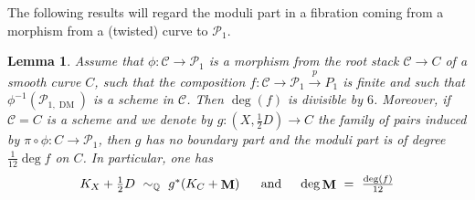 \documentclass[a4paper,12pt]{amsart}
\newcommand{\marg}[1]{\normalsize{{\color{red}\footnote{{\color{blue}#1}}}{\marginpar[{\color{blue}\hfill\tiny\thefootnote$\rightarrow$}]{{\color{purple}$\leftarrow$\tiny\thefootnote}}}}}
\DeclareMathOperator{\Pic}{Pic}
\newcommand{\bQ}{{\mathbb Q}}
\newcommand{\bP}{{\mathbb P}}
\newcommand{\sP}{{\mathscr{P}}}
\DeclareMathOperator{\bfM}{{\bf{M}}}
\newcommand\cC{{\mathcal{C}}}
\newcommand\cM{{\mathcal{M}}}
\newtheorem{lemma}[theorem]{Lemma}
\newtheorem*{notation}{Notation}
\newcommand{\Gio}[1]{\marg{(Giovanni) #1}}
\newcommand{\dm}{{\operatorname{DM}}}
\theoremstyle{definition}
\theoremstyle{remark}
\begin{document}
The following results will regard the moduli part in a fibration coming from a morphism from a (twisted) curve to $\sP_1$.
\begin{lemma}\label{lemma_relation_degree_of_map_to_p1_and_moduli_part}
    Assume that $\phi\colon \cC\to \sP_1$ is a morphism from the root stack $\cC\to C$ of a smooth curve $C$, such that the composition $f\colon \cC\to \sP_1\xrightarrow{p} P_1$ is finite and such that $\phi^{-1}(\sP_{1,\dm})$ is a scheme in $\cC$. Then $\deg(f)$ is divisible by $6$. Moreover, if $\cC = C$ is a scheme and we denote by $g\colon (X,\frac{1}{2}D)\to C$ the family of pairs induced by $\pi\circ\phi\colon C\to \sP_1$, then $g$ has no boundary part and the moduli part is of degree $\frac{1}{12}\deg f$ on $C$. In particular, one has
    \[\textstyle
    K_X+\frac{1}{2}D\ \sim_\bQ \ g^*(K_C+\bfM)\ \ \ \  \text{ and }\  \ \ \deg \bfM \ =\ \frac{\deg(f)}{12}
    \]
\end{lemma}
\end{document}
